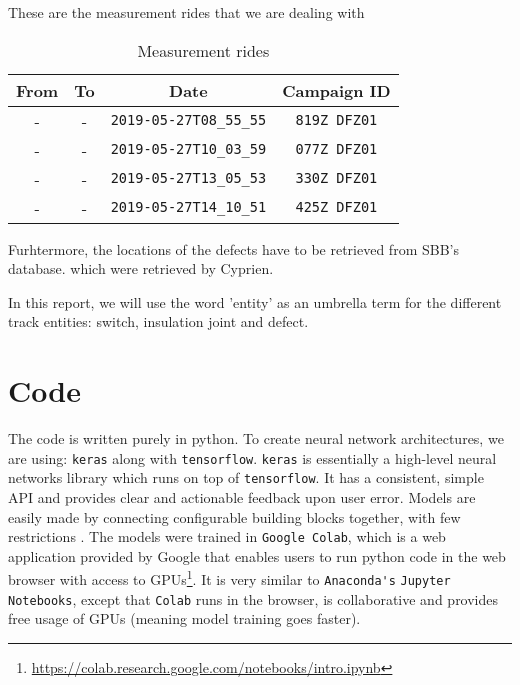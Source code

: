 These are the measurement rides that we are dealing with
\begin{table}[H]
	\centering
	\begin{tabular}{|c|c|c|c|} \hline
		\textbf{From} & \textbf{To} & \textbf{Date} & \textbf{Campaign ID}\\ \hline \hline 
		- & - &  \verb|2019-05-27T08_55_55| & \verb|819Z DFZ01| \\ \hline 
		- & - &  \verb|2019-05-27T10_03_59| & \verb|077Z DFZ01| \\ \hline 
		- & - &  \verb|2019-05-27T13_05_53| & \verb|330Z DFZ01| \\ \hline 
		- & - &  \verb|2019-05-27T14_10_51| & \verb|425Z DFZ01| \\ \hline 

	\end{tabular}
	\caption{Measurement rides}
	\label{datasets}
\end{table}

Furhtermore, the locations of the defects have to be retrieved from SBB's database. which were retrieved by Cyprien. 

In this report, we will use the word 'entity' as an umbrella term for the different track entities: switch, insulation joint and defect.


\section{Code}
\label{int:sec:code}
The code is written purely in python. To create neural network architectures, we are using: \verb|keras| along with \verb|tensorflow|. \verb|keras| is essentially a high-level neural networks library which runs on top of \verb|tensorflow|. It has a consistent, simple API and provides clear and actionable feedback upon user error. Models are easily made by connecting configurable building blocks together, with few restrictions \cite{TensorFl31:online}. The models were trained in \verb|Google Colab|, which is a web application provided by Google that enables users to run python code in the web browser with access to GPUs\footnote{\url{https://colab.research.google.com/notebooks/intro.ipynb}}. It is very similar to \verb|Anaconda's| \verb|Jupyter Notebooks|, except that \verb|Colab| runs in the browser, is collaborative and provides free usage of GPUs (meaning model training goes faster).\\


